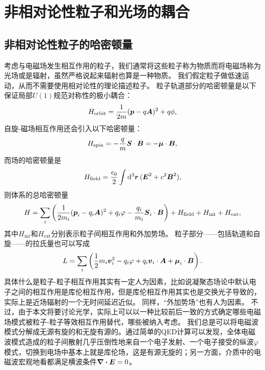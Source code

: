 \section{非相对论性粒子和光场的耦合}

\subsection{非相对论性粒子的哈密顿量}\label{sec:particle-hamiltonian}

考虑与电磁场发生相互作用的粒子，我们通常将这些粒子称为物质而将电磁场称为光场或是辐射，虽然严格说起来辐射也算是一种物质。
我们假定粒子做低速运动，从而不需要使用相对论性的理论描述粒子。
粒子轨道部分的哈密顿量是以下保证局部$U(1)$规范对称性的极小耦合：
\begin{equation}
    {H}_\text{orbit} = \frac{1}{2m} ({\vb*{p}} - q \vb*{A})^2 + q \phi,
    \label{eq:minimal-coupling}
\end{equation}
自旋-磁场相互作用还会引入以下哈密顿量：
\begin{equation}
    {H}_\text{spin} = - \frac{q}{m} {\vb*{S}} \cdot \vb*{B} = - \vb*{\mu} \cdot \vb*{B},
\end{equation}
而场的哈密顿量是
\begin{equation}
    {H}_\text{field} = \frac{\epsilon_0}{2} \int \dd[3]{\vb*{r}} (\vb*{E}^2 + c^2 \vb*{B}^2),
\end{equation}
则体系的总哈密顿量
\begin{equation}
    {H} = \sum_i \left( \frac{1}{2m_i} ({\vb*{p}_i} - q_i \vb*{A})^2 + q_i \varphi - \frac{q_i}{m_i} \vb*{S}_i \cdot \vb*{B} \right) + {H}_\text{field} + {H}_\text{int} + {H}_\text{ext},
    \label{eq:whole-system-hamiltonian}
\end{equation}
其中${H}_\text{int}$和${H}_\text{ext}$分别表示粒子间相互作用和外加势场。
粒子部分——包括轨道和自旋——的拉氏量也可以写成
\begin{equation}
    L = \sum_i \left( \frac{1}{2} m_i \vb*{v}_i^2 - q_i \varphi + q_i \vb*{v}_i \cdot \vb*{A} + \vb*{\mu}_i \cdot \vb*{B} \right).
\end{equation}
具体什么是粒子-粒子相互作用其实有一定人为因素，比如说凝聚态场论中默认电子之间的相互作用是库伦相互作用，但是库伦相互作用其实也是交换光子导致的，实际上是近场辐射的一个无时间延迟近似。
同样，“外加势场”也有人为因素。
不过，由于本文将要讨论光学，实际上可以以一种比较前后一致的方式确定哪些电磁场模式被粒子-粒子等效相互作用替代，哪些被纳入考虑。
我们总是可以将电磁波模式分解成无源有旋的和无旋有源的。通过简单的QED计算可以发现，全体电磁波模式造成的粒子间散射几乎压倒性地来自一个电子发射、一个电子接受的纵波$\varphi$模式，切换到电场中基本上就是库伦场，这是有源无旋的；另一方面，介质中的电磁波宏观地看都满足横波条件$\div{\vb*{E}}=0$。%
